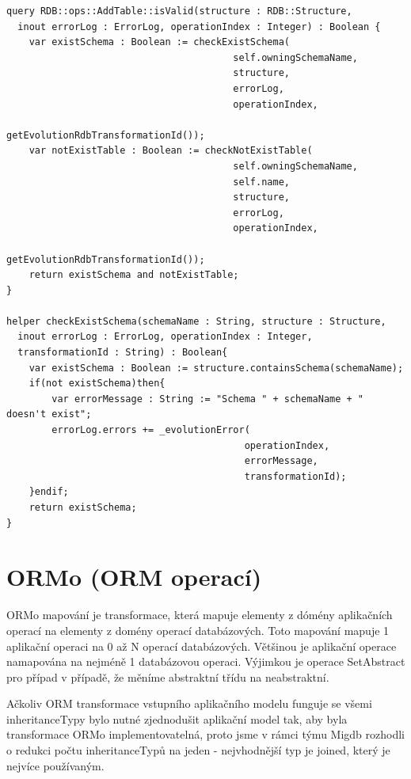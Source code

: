 \documentclass[11pt,twoside,a4paper]{book}
\begin{document}
\begin{verbatim}
query RDB::ops::AddTable::isValid(structure : RDB::Structure, 
  inout errorLog : ErrorLog, operationIndex : Integer) : Boolean {
    var existSchema : Boolean := checkExistSchema(
                                        self.owningSchemaName, 
                                        structure, 
                                        errorLog, 
                                        operationIndex, 
                                        getEvolutionRdbTransformationId());
    var notExistTable : Boolean := checkNotExistTable(
                                        self.owningSchemaName, 
                                        self.name, 
                                        structure, 
                                        errorLog, 
                                        operationIndex, 
                                        getEvolutionRdbTransformationId());
    return existSchema and notExistTable;
}

helper checkExistSchema(schemaName : String, structure : Structure, 
  inout errorLog : ErrorLog, operationIndex : Integer, 
  transformationId : String) : Boolean{ 
    var existSchema : Boolean := structure.containsSchema(schemaName);
    if(not existSchema)then{
        var errorMessage : String := "Schema " + schemaName + " doesn't exist";
        errorLog.errors += _evolutionError(
                                          operationIndex, 
                                          errorMessage,
                                          transformationId); 
    }endif;
    return existSchema;        
}

\end{verbatim}

\section{ORMo (ORM operací)}\label{ORMo}

ORMo mapování je transformace, která mapuje elementy z dómény aplikačních
operací na elementy z domény operací databázových. Toto mapování mapuje 1
aplikační operaci na 0 až N operací databázových. Většinou je aplikační
operace namapována na nejméně 1 databázovou operaci. Výjimkou je operace
SetAbstract pro případ v případě, že měníme abstraktní třídu na neabstraktní.

Ačkoliv ORM transformace vstupního aplikačního modelu funguje se všemi
inheritanceTypy bylo nutné zjednodušit aplikační model tak, aby byla
transformace ORMo implementovatelná, proto jsme v rámci týmu Migdb rozhodli o
redukci počtu inheritanceTypů na jeden - nejvhodnější typ je joined, který je
nejvíce používaným.
\end{document}
